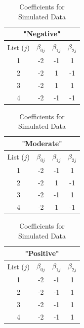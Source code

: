 \documentclass[
  12pt,
]{article}
\begin{document}
\begin{table}[H]
\centering
\begin{tabular}{||c c c c||} 
 \hline
 \multicolumn{4}{||c||}{"Negative"}\\
 \hline
 List ($j$) & $\beta_{0j}$ & $\beta_{1j}$ & $\beta_{2j}$   \\ [0.5ex] 
 \hline\hline
 1 & -2 &  -1  & 1 \\ 
 2 & -2 & 1  &  -1 \\
 3 & -2 & 1  &  1 \\
 4 & -2 &  -1  &  -1 \\
 \hline
\end{tabular}
\begin{tabular}{||c c c c||} 
\hline
 \multicolumn{4}{||c||}{"Moderate"}\\
 \hline
 List ($j$) & $\beta_{0j}$ & $\beta_{1j}$ & $\beta_{2j}$   \\ [0.5ex] 
 \hline\hline
 1 & -2 &  -1  & 1 \\ 
 2 & -2 & 1  &  -1 \\
 3 & -2 & -1  &  1 \\
 4 & -2 &  1  &  -1 \\
 \hline
\end{tabular}
\begin{tabular}{||c c c c||} 
 \hline
 \multicolumn{4}{||c||}{"Positive"}\\
 \hline
 List ($j$) & $\beta_{0j}$ & $\beta_{1j}$ & $\beta_{2j}$   \\ [0.5ex] 
 \hline\hline
 1 & -2 &  -1  & 1 \\ 
 2 & -2 & -1  &  1 \\
 3 & -2 & -1  &  1 \\
 4 & -2 &  -1  &  1 \\
 \hline
\end{tabular}
\caption{Coefficients for Simulated Data}
\label{table:1}
\end{table}
\end{document}
